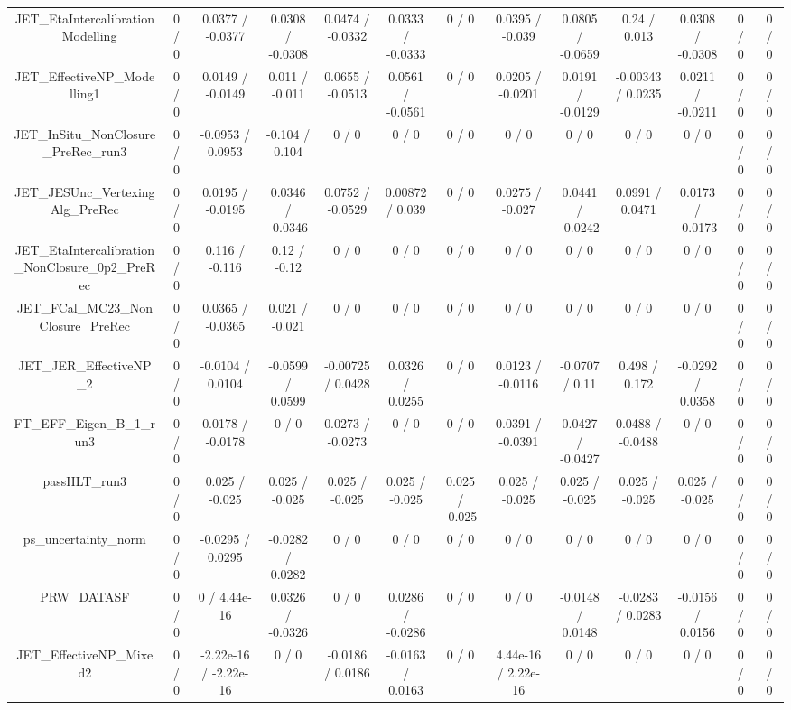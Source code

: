 \documentclass[10pt]{article}
\begin{document}
\begin{table}[htbp]
\begin{center}
\begin{tabular}{|c|c|c|c|c|c|c|c|c|c|c|c|c|}
  JET_EtaIntercalibration_Modelling & 0 / 0 & 0.0377 / -0.0377 & 0.0308 / -0.0308 & 0.0474 / -0.0332 & 0.0333 / -0.0333 & 0 / 0 & 0.0395 / -0.039 & 0.0805 / -0.0659 & 0.24 / 0.013 & 0.0308 / -0.0308 & 0 / 0 & 0 / 0 \\ 
  JET_EffectiveNP_Modelling1 & 0 / 0 & 0.0149 / -0.0149 & 0.011 / -0.011 & 0.0655 / -0.0513 & 0.0561 / -0.0561 & 0 / 0 & 0.0205 / -0.0201 & 0.0191 / -0.0129 & -0.00343 / 0.0235 & 0.0211 / -0.0211 & 0 / 0 & 0 / 0 \\ 
  JET_InSitu_NonClosure_PreRec_run3 & 0 / 0 & -0.0953 / 0.0953 & -0.104 / 0.104 & 0 / 0 & 0 / 0 & 0 / 0 & 0 / 0 & 0 / 0 & 0 / 0 & 0 / 0 & 0 / 0 & 0 / 0 \\ 
  JET_JESUnc_VertexingAlg_PreRec & 0 / 0 & 0.0195 / -0.0195 & 0.0346 / -0.0346 & 0.0752 / -0.0529 & 0.00872 / 0.039 & 0 / 0 & 0.0275 / -0.027 & 0.0441 / -0.0242 & 0.0991 / 0.0471 & 0.0173 / -0.0173 & 0 / 0 & 0 / 0 \\ 
  JET_EtaIntercalibration_NonClosure_0p2_PreRec & 0 / 0 & 0.116 / -0.116 & 0.12 / -0.12 & 0 / 0 & 0 / 0 & 0 / 0 & 0 / 0 & 0 / 0 & 0 / 0 & 0 / 0 & 0 / 0 & 0 / 0 \\ 
  JET_FCal_MC23_NonClosure_PreRec & 0 / 0 & 0.0365 / -0.0365 & 0.021 / -0.021 & 0 / 0 & 0 / 0 & 0 / 0 & 0 / 0 & 0 / 0 & 0 / 0 & 0 / 0 & 0 / 0 & 0 / 0 \\ 
  JET_JER_EffectiveNP_2 & 0 / 0 & -0.0104 / 0.0104 & -0.0599 / 0.0599 & -0.00725 / 0.0428 & 0.0326 / 0.0255 & 0 / 0 & 0.0123 / -0.0116 & -0.0707 / 0.11 & 0.498 / 0.172 & -0.0292 / 0.0358 & 0 / 0 & 0 / 0 \\ 
  FT_EFF_Eigen_B_1_run3 & 0 / 0 & 0.0178 / -0.0178 & 0 / 0 & 0.0273 / -0.0273 & 0 / 0 & 0 / 0 & 0.0391 / -0.0391 & 0.0427 / -0.0427 & 0.0488 / -0.0488 & 0 / 0 & 0 / 0 & 0 / 0 \\ 
  passHLT_run3 & 0 / 0 & 0.025 / -0.025 & 0.025 / -0.025 & 0.025 / -0.025 & 0.025 / -0.025 & 0.025 / -0.025 & 0.025 / -0.025 & 0.025 / -0.025 & 0.025 / -0.025 & 0.025 / -0.025 & 0 / 0 & 0 / 0 \\ 
  ps_uncertainty_norm & 0 / 0 & -0.0295 / 0.0295 & -0.0282 / 0.0282 & 0 / 0 & 0 / 0 & 0 / 0 & 0 / 0 & 0 / 0 & 0 / 0 & 0 / 0 & 0 / 0 & 0 / 0 \\ 
  PRW_DATASF & 0 / 0 & 0 / 4.44e-16 & 0.0326 / -0.0326 & 0 / 0 & 0.0286 / -0.0286 & 0 / 0 & 0 / 0 & -0.0148 / 0.0148 & -0.0283 / 0.0283 & -0.0156 / 0.0156 & 0 / 0 & 0 / 0 \\ 
  JET_EffectiveNP_Mixed2 & 0 / 0 & -2.22e-16 / -2.22e-16 & 0 / 0 & -0.0186 / 0.0186 & -0.0163 / 0.0163 & 0 / 0 & 4.44e-16 / 2.22e-16 & 0 / 0 & 0 / 0 & 0 / 0 & 0 / 0 & 0 / 0 \\ 

\end{tabular}
\end{center}
\end{table}
\end{document}
